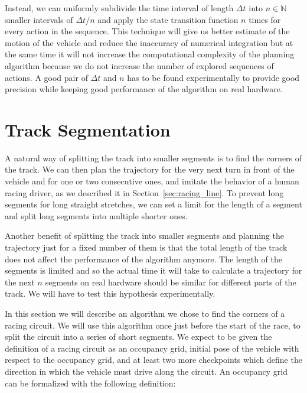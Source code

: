 Instead, we can uniformly subdivide the time interval of length $\Delta t$ into $n\in\mathbb{N}$ smaller intervals of $\Delta t/n$ and apply the state transition function $n$ times for every action in the sequence. This technique will give us better estimate of the motion of the vehicle and reduce the inaccuracy of numerical integration but at the same time it will not increase the computational complexity of the planning algorithm because we do not increase the number of explored sequences of actions. A good pair of $\Delta t$ and $n$ has to be found experimentally to provide good precision while keeping good performance of the algorithm on real hardware.

\section{Track Segmentation}

A natural way of splitting the track into smaller segments is to find the corners of the track. We can then plan the trajectory for the very next turn in front of the vehicle and for one or two  consecutive ones, and imitate the behavior of a human racing driver, as we described it in Section~\ref{sec:racing_line}. To prevent long segments for long straight stretches, we can set a limit for the length of a segment and split long segments into multiple shorter ones.

Another benefit of splitting the track into smaller segments and planning the trajectory just for a fixed number of them is that the total length of the track does not affect the performance of the algorithm anymore. The length of the segments is limited and so the actual time it will take to calculate a trajectory for the next $n$ segments on real hardware should be similar for different parts of the track. We will have to test this hypothesis experimentally.

In this section we will describe an algorithm we chose to find the corners of a racing circuit. We will use this algorithm once just before the start of the race, to split the circuit into a series of short segments. We expect to be given the definition of a racing circuit as an occupancy grid, initial pose of the vehicle with respect to the occupancy grid, and at least two more checkpoints which define the direction in which the vehicle must drive along the circuit. An occupancy grid can be formalized with the following definition:

